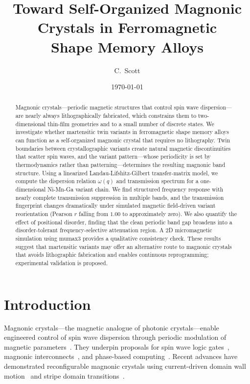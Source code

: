 \documentclass[aip,jap,reprint,floatfix,nofootinbib]{revtex4-2}
\begin{document}
\title{Toward Self-Organized Magnonic Crystals in Ferromagnetic\\Shape Memory Alloys}

\author{C.~Scott}

\date{\today}

\begin{abstract}
Magnonic crystals---periodic magnetic structures that control spin wave dispersion---are nearly always lithographically fabricated, which constrains them to two-dimensional thin-film geometries and to a small number of discrete states. We investigate whether martensitic twin variants in ferromagnetic shape memory alloys can function as a self-organized magnonic crystal that requires no lithography. Twin boundaries between crystallographic variants create natural magnetic discontinuities that scatter spin waves, and the variant pattern---whose periodicity is set by thermodynamics rather than patterning---determines the resulting magnonic band structure. Using a linearized Landau-Lifshitz-Gilbert transfer-matrix model, we compute the dispersion relation $\omega(q)$ and transmission spectrum for a one-dimensional Ni-Mn-Ga variant chain. We find structured frequency response with nearly complete transmission suppression in multiple bands, and the transmission fingerprint changes dramatically under simulated magnetic field-driven variant reorientation (Pearson $r$ falling from $1.00$ to approximately zero). We also quantify the effect of positional disorder, finding that the clean periodic band gap broadens into a disorder-tolerant frequency-selective attenuation region. A 2D micromagnetic simulation using mumax3 provides a qualitative consistency check. These results suggest that martensitic variants may offer an alternative route to magnonic crystals that avoids lithographic fabrication and enables continuous reprogramming; experimental validation is proposed.
\end{abstract}

\maketitle

\section{Introduction}
\label{sec:introduction}

Magnonic crystals---the magnetic analogue of photonic crystals---enable engineered control of spin wave dispersion through periodic modulation of magnetic parameters~\cite{Nikitov2015,Chumak2015,Krawczyk2014,Barman2021}. They underpin proposals for spin wave logic gates~\cite{Schneider2008}, magnonic interconnects~\cite{Vogt2014}, and phase-based computing~\cite{Fischer2017}. Recent advances have demonstrated reconfigurable magnonic crystals using current-driven domain wall motion~\cite{Gallardo2022} and stripe domain transitions~\cite{Graczyk2024}.
\end{document}
